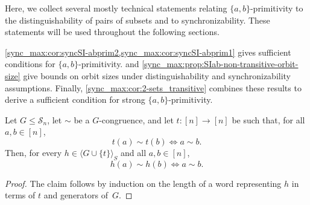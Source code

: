 
Here, we collect several mostly technical statements relating $\{a,b\}$-primitivity to 
the distinguishability of pairs of subsets and to synchronizability. These statements will be used throughout the following sections.

\cref{sync_max:cor:syncSI-abprim2,sync_max:cor:syncSI-abprim1}
gives sufficient conditions for $\{a,b\}$-primitivity.
and \cref{sync_max:prop:SIab-non-transitive-orbit-size} 
give bounds on orbit sizes
under distinguishability and synchronizability assumptions.
Finally, \cref{sync_max:cor:2-sets_transitive} 
combines these results to derive a sufficient condition for strong $\{a,b\}$-primitivity.


\begin{lemma}\label{sync_max:lem:syncSI-block}
	Let $G \leq \mathcal S_n$, let $\sim$ be a $G$-congruence,
	and let $t \colon [n] \to [n]$ be such that, for all $a,b\in[n]$,
	\[
	t(a) \sim t(b)
	\iff
	a \sim b.
	\]
	Then, for every $h \in \langle G \cup \{t\} \rangle_S$ and all $a,b\in[n]$,
	\[
	h(a) \sim h(b)
	\iff
	a \sim b.
	\]
\end{lemma}
\begin{proof}
	The claim follows by induction on the length of a word representing $h$
	in terms of $t$ and generators of~$G$.
\end{proof}

